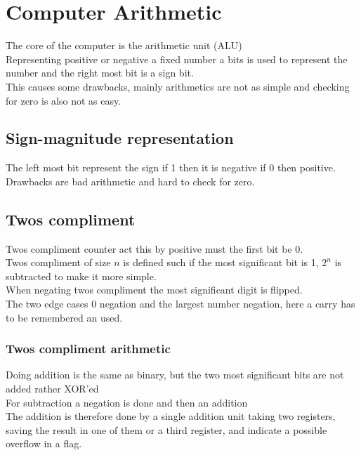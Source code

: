 \documentclass[12pt, a4paper]{article}
\begin{document}
	\section{Computer Arithmetic}
		The core of the computer is the arithmetic unit (ALU)\\
		Representing positive or negative a fixed number a bits is used to represent the number and the right most bit is a sign bit.\\
		This causes some drawbacks, mainly arithmetics are not as simple and checking for zero is also not as easy.\\
		\subsection{Sign-magnitude representation}
			The left most bit represent the sign if 1 then it is negative if 0 then positive.\\
			Drawbacks are bad arithmetic and hard to check for zero.
		\subsection{Twos compliment}
			Twos compliment counter act this by positive must the first bit be 0.\\
			Twos compliment of size $n$ is defined such if the most significant bit is 1, $2^n$ is subtracted to make it more simple.\\
			When negating twos compliment the most significant digit is flipped.\\
			The two edge cases 0 negation and the largest number negation, here a carry has to be remembered an used.\\
			\subsubsection{Twos compliment arithmetic}
				Doing addition is the same as binary, but the two most significant bits are not added rather XOR'ed\\
				For subtraction a negation is done and then an addition\\
				The addition is therefore done by a single addition unit taking two registers, saving the result in one of them or a third register, and indicate a possible overflow in a flag.\\
\end{document}
